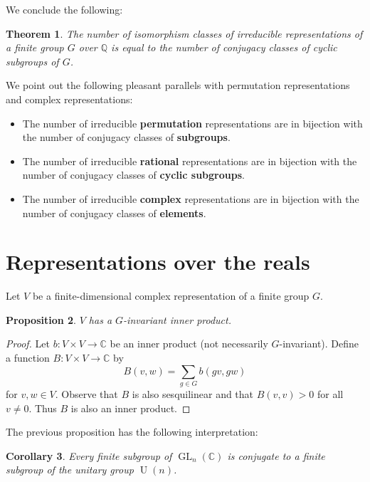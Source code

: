 \documentclass[12pt]{article}
\theoremstyle{plain}
\newtheorem{theorem}{Theorem}[section]
\newtheorem{proposition}[theorem]{Proposition}
\newtheorem{corollary}[theorem]{Corollary}
\theoremstyle{definition}
\theoremstyle{remark}
\numberwithin{equation}{section}
\begin{document}
We conclude the following:

\begin{theorem}
The number of isomorphism classes of irreducible representations of a
finite group $G$ over $\mathbb{Q}$ is equal to the number of conjugacy
classes of cyclic subgroups of $G$.
\end{theorem}

We point out the following pleasant parallels with permutation
representations and complex representations:

\begin{itemize}
\item The number of irreducible \textbf{permutation} representations are in
bijection with the number of conjugacy classes of \textbf{subgroups}.
\item The number of irreducible \textbf{rational} representations are in
bijection with the number of conjugacy classes of \textbf{cyclic
subgroups}.
\item The number of irreducible \textbf{complex} representations are in
bijection with the number of conjugacy classes of \textbf{elements}.
\end{itemize}

\section{Representations over the reals}

Let $V$ be a finite-dimensional
complex representation of a finite group $G$.

\begin{proposition} \label{prop:Ginner}
$V$ has a $G$-invariant inner product.
\end{proposition}

\begin{proof}
Let $b : V \times V \to \mathbb{C}$ be an inner product (not necessarily
$G$-invariant).
Define a function $B : V \times V \to \mathbb{C}$ by
\[
B(v,w) = \sum_{g \in G}b(gv,gw)
\]
for $v, w \in V$.
Observe that $B$ is also sesquilinear
and that $B(v,v) > 0$ for all $v \ne 0$.
Thus $B$ is also an inner product.
\end{proof}

The previous proposition has the following interpretation:

\begin{corollary}
Every finite subgroup of $\operatorname{GL}_n(\mathbb{C})$
is conjugate to a finite subgroup of the unitary group
$\operatorname{U}(n)$.
\end{corollary}
\end{document}
